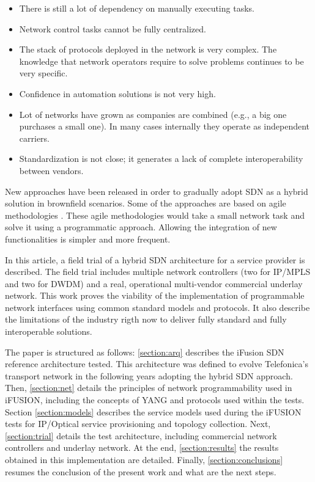 \documentclass[a4paper,fleqn]{cas-dc}
\begin{document}
\begin{itemize}
    \item There is still a lot of dependency on manually executing tasks.
    \item Network control tasks cannot be fully centralized.
    \item The stack of protocols deployed in the network is very complex.  The knowledge that network operators require to solve problems continues to be very specific.
    \item Confidence in automation solutions is not very high.
    \item Lot of networks have grown as companies are combined (e.g., a big one purchases a small one). In many cases internally they operate as independent carriers. 
   \item Standardization is not close; it generates a lack of complete interoperability between vendors.
\end{itemize}

New approaches have been released in order to gradually adopt SDN as a hybrid solution in brownfield scenarios. Some of the approaches are based on agile methodologies \cite{devlic2012use,choi2018agile}. 
These agile methodologies would take a small network task and solve it using a programmatic approach. Allowing the integration of new functionalities is simpler and more frequent.

In this article, a field trial of a hybrid SDN architecture for a service provider is described. The field trial includes multiple network controllers (two for IP/MPLS and two for DWDM) and a real, operational multi-vendor commercial underlay network. This work proves the viability of the implementation of programmable network interfaces using common standard models and protocols. It also describe the limitations of the industry rigth now to deliver fully standard and fully interoperable solutions.    

The paper is structured as follows: \cref{section:arq} describes the iFusion SDN reference architecture tested. This architecture was defined to evolve Telefonica's transport network in the following years adopting the hybrid SDN approach. Then, \cref{section:net} details the principles of network programmability used in iFUSION, including the concepts of YANG and protocols used within the tests. Section \cref{section:models} describes the service models used during the iFUSION tests for IP/Optical service provisioning and topology collection. Next, \cref{section:trial} details the test architecture, including commercial network controllers and underlay network. At the end, \cref{section:results}  the results obtained in this implementation are detailed. Finally, \cref{section:conclusions} resumes the conclusion of the present work and what are the next steps.    
\end{document}
